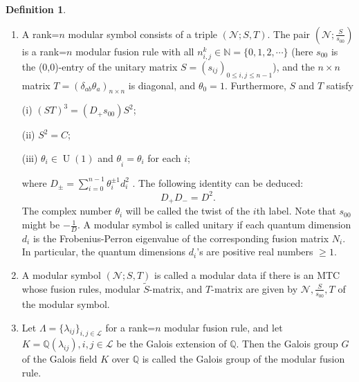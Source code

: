\documentclass[12pt,psamsfonts]{amsart}
\newcommand{\N}{\mathbb{N}}
\newcommand{\Q}{\mathbb Q}
\newcommand{\mL}{\mathcal{L}}
\newcommand{\mN}{\mathcal{N}}
\DeclareMathOperator{\U}{U}
\newcommand{\Z}{\mathbb Z}
\newcommand{\tS}{\tilde{S}}
\numberwithin{equation}{section}
\theoremstyle{definition}
\newtheorem{definition}[theorem]{Definition}
\begin{document}
\begin{definition}
\begin{enumerate}
The matrix $N_i$ will be called the $i$th fusion matrix.  From
identities (\ref{Verlinde}), the diagonal entries in $\Lambda_i$ are
the eigenvalues of $N_i$, and the columns of $\tS$ are the
corresponding eigenvectors.  The non-zero number $D$ will be
called the total quantum order, $d_i=\tilde{s}_{i0}$ the quantum
dimension of the $i$-th label, and $D^2=\sum_{i=0}^{n-1}d_i^2$ the
global quantum dimension.

\item A rank=$n$ modular symbol consists of a triple $(\mN;S,T)$.
The pair $(\mN;\frac{S}{s_{00}})$ is a rank=$n$ modular fusion
rule with all $n_{i,j}^k\in \N=\{0,1,2,\cdots\}$ (here $s_{00}$ is
the (0,0)-entry of the unitary matrix $S=(s_{ij})_{0\leq i,j\leq
n-1}$), and the $n\times n$ matrix
$T=(\delta_{ab}\theta_a)_{n\times n}$ is diagonal, and $\theta_0=1$. Furthermore,
$S$ and $T$ satisfy

(i) $(ST)^3=(D_{+}s_{00})S^2$;

(ii) $S^2=C$;

(iii) $\theta_i \in \U(1)$ and $\theta_{\hat{i}}=\theta_i$ for
each $i$;

where $D_{\pm}=\sum_{i=0}^{n-1}\theta_i^{\pm 1} d_i^2$ .  The
following identity can be deduced:
\begin{equation}\label{balance}
D_+D_{-}=D^2.
\end{equation}
The complex number $\theta_i$ will be called the twist of the
$i$th label.  Note that $s_{00}$ might be $-\frac{1}{D}$.  A
modular symbol is called unitary if each quantum dimension $d_i$
is the Frobenius-Perron eigenvalue of the corresponding fusion
matrix $N_i$.  In particular, the quantum dimensions $d_i$'s are
positive real numbers $\geq 1$.

\item A modular symbol $(\mN;S,T)$ is called a modular data if there is an MTC whose
fusion rules, modular $\tilde{S}$-matrix, and $T$-matrix are given by
$\mN, \frac{S}{s_{00}}, T$ of the modular symbol.

\item Let $\Lambda=\{\lambda_{ij}\}_{i,j\in \mL}$ for a rank=$n$
modular fusion rule, and let $K=\Q(\lambda_{ij}), i,j\in \mL$ be the
Galois extension of $\Q$. Then the Galois group $G$ of the Galois
field $K$ over $\Q$ is called the Galois group of the modular fusion rule.

\end{enumerate}

\end{definition}
\end{document}
